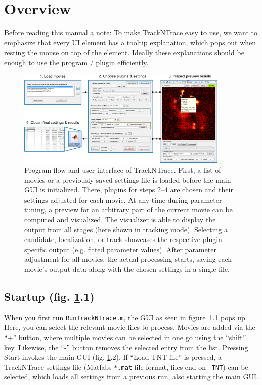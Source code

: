\documentclass[11pt,onside]{report}
\numberwithin{equation}{chapter}
\begin{document}
\section{Overview}\label{sec:overview}
Before reading this manual a note: To make TrackNTrace easy to use, we want to emphasize that every UI element has a tooltip explanation, which pops out when resting the mouse on top of the element. Ideally these explanations should be enough to use the program / plugin efficiently.

\begin{figure}[!h]
\centering
\includegraphics[width=0.9\textwidth]{./fig0.pdf} 
\caption{Program flow and user interface of TrackNTrace. First, a list of movies or a previously saved settings file is loaded before the main GUI is initialized. There, plugins for steps 2{--}4 are chosen and their settings adjusted for each movie. At any time during parameter tuning, a preview for an arbitrary part of the current movie can be computed and visualized. The visualizer is able to display the output from all stages (here shown in tracking mode). Selecting a candidate, localization, or track showcases the respective plugin-specific output (e.g. fitted parameter values). After parameter adjustment for all movies, the actual processing starts, saving each movie's output data along with the chosen settings in a single file.}
\label{fig:flowdiagram}
\end{figure}

\subsection*{Startup (fig. \ref{fig:flowdiagram}.1)}
When you first run \texttt{RunTrackNTrace.m}, the GUI as seen in figure~\ref{fig:flowdiagram}.1 pops up. Here, you can select the relevant movie files to process. Movies are added via the ``\textsf{+}'' button, where multiple movies can be selected in one go using the ``shift'' key. Likewise, the ``\textsf{-}'' button removes the selected entry from the list. Pressing \textsf{Start} invokes the main GUI (fig. \ref{fig:flowdiagram}.2). If ``\textsf{Load TNT file}'' is pressed, a TrackNTrace settings file (Matlabs \texttt{*.mat} file format, files end on \texttt{\_TNT}) can be selected, which loads all settings from a previous run, also starting the main GUI.
\end{document}
